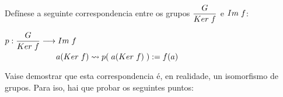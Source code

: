 \documentclass[twoside]{report}
\theoremstyle{mystyle}
\begin{document}
\noindent Defínese a seguinte correspondencia entre os grupos $\displaystyle \frac{G}{Ker \hspace{1mm} f}$ e $Im \hspace{1mm} f$: 

    \begin{center}
        $p: \displaystyle \frac{G}{Ker \hspace{1mm} f} \longrightarrow Im \hspace{1mm} f$ \\
        \vspace{2mm}
        $\hspace{22mm} a(Ker \hspace{1mm} f) \leadsto p(\hspace{1mm}a(Ker \hspace{1mm} f)\hspace{1mm}) := f(a)$
    \end{center} 
    
\noindent Vaise demostrar que esta correspondencia é, en realidade, un isomorfismo de grupos. Para iso, hai que probar os seguintes puntos: 
\end{document}
